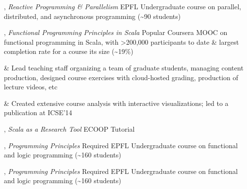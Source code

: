 \documentclass[9pt]{article}
\begin{document}
\medskip
{}

, {\em Reactive Programming \& Parallelism} 
\newline\noindent EPFL Undergraduate course on parallel, distributed, and asynchronous
\newline\noindent programming (\textasciitilde90 students)
\bigskip

, {\em Functional Programming Principles in Scala} 
\newline\noindent Popular Coursera MOOC on functional programming in Scala,
\newline\noindent with >200,000 participants to date \& largest completion
\newline\noindent rate for a course its size (\textasciitilde19\%)
\vspace{0.05in}
\begin{easylist}[itemize]
& Lead teaching staff organizing a team of graduate students,
\newline managing content production, designed course exercises
\newline with cloud-hosted grading, production of lecture videos, etc

& Created extensive course analysis with interactive
\newline visualizations; led to a publication at ICSE'14
\end{easylist}
\bigskip

, {\em Scala as a Research Tool} 
\newline\noindent ECOOP Tutorial
\bigskip

, {\em Programming Principles} 
\newline\noindent Required EPFL Undergraduate course on functional and logic programming
\newline\noindent (\textasciitilde160 students)
\bigskip

, {\em Programming Principles} 
\newline\noindent Required EPFL Undergraduate course on functional and logic programming
\newline\noindent (\textasciitilde160 students)
\bigskip


\medskip
{}
\end{document}
